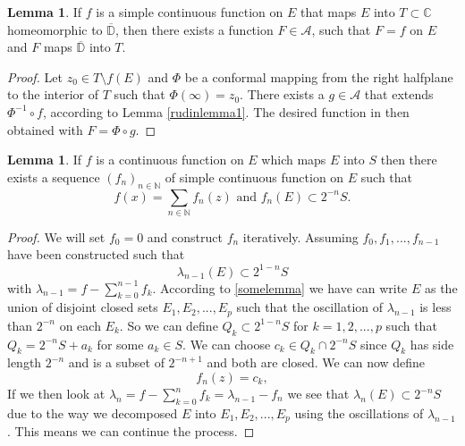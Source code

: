 \documentclass[a4paper,12pt,twoside,BCOR=10mm]{scrbook}
\theoremstyle{definition}
\theoremstyle{definition}
\newtheorem{lemma}[theorem]{Lemma}
\theoremstyle{definition}
\begin{document}
\begin{lemma}
\label{rudinlemma2}
If $f$ is a simple continuous function on $E$ that maps $E$ into $T \subset \mathbb{C}$ homeomorphic to $\overline{\mathbb{D}}$, then there exists a function $F \in \mathcal{A}$, such that $F = f$ on $E$ and $F$ maps $\overline{\mathbb{D}}$ into $T$.
\end{lemma}
\begin{proof}
Let $z_0 \in T \setminus f(E)$ and $\Phi$ be a conformal mapping from the right halfplane to the interior of $T$ such that $\Phi(\infty) = z_0$.
There exists a $g \in \mathcal{A}$ that extends $\Phi^{-1} \circ f$, according to Lemma \ref{rudinlemma1}.
The desired function in then obtained with $F = \Phi \circ g$.
\end{proof}
\begin{lemma}
\label{rudinlemma3}
If $f$ is a continuous function on $E$ which maps $E$ into $S$ then there exists a sequence $(f_n)_{n \in \mathbb{N}}$ of simple continuous function on $E$ such that
\[
	f(x) = \sum_{n \in \mathbb{N}} f_n(z)
	\text{ and }
	f_n(E) \subset 2^{-n}S.
\]
\end{lemma}
\begin{proof}
We will set $f_0 = 0$ and construct $f_n$ iteratively.
Assuming $f_0, f_1, ..., f_{n - 1}$ have been constructed such that
\[
	\lambda_{n - 1}(E) \subset 2^{1 - n}S
\]
with $\lambda_{n - 1} = f - \sum_{k = 0}^{n - 1}f_k$.
According to \ref{somelemma} we have can write $E$ as the union of disjoint closed sets $E_1, E_2, ..., E_p$ such that the oscillation of $\lambda_{n - 1}$ is less than $2^{-n}$ on each $E_k$.
So we can define $Q_k \subset 2^{1 - n}S$ for $k = 1, 2, ..., p$ such that $Q_k = 2^{-n}S + a_k$ for some $a_k \in S$.
We can choose $c_k \in Q_k \cap 2^{-n}S$ since $Q_k$ has side length $2^{-n}$ and is a subset of $2^{-n + 1}$ and both are closed.
We can now define
\[
	f_n(z) = c_k, \tag*{$z \in E_k,\ k = 1, 2, ..., p$.}
\]
If we then look at $\lambda_n = f - \sum_{k = 0}^nf_k = \lambda_{n - 1} - f_n$ we see that $\lambda_n(E) \subset 2^{-n}S$ due to the way we decomposed $E$ into $E_1, E_2, ..., E_p$ using the oscillations of $\lambda_{n - 1}$.
This means we can continue the process.
\end{proof}
\end{document}
